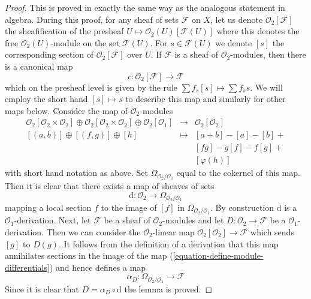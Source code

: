 \documentclass[10pt,a4paper]{amsart}
\theoremstyle{plain}
\theoremstyle{definition}
\theoremstyle{remark}
\numberwithin{equation}{subsection}
\begin{document}
\begin{proof}
This is proved in exactly the same way as the analogous statement in algebra.
During this proof, for any sheaf of sets $\mathcal{F}$ on $X$,
let us denote $\mathcal{O}_2[\mathcal{F}]$ the sheafification of the
presheaf $U \mapsto \mathcal{O}_2(U)[\mathcal{F}(U)]$ where this denotes
the free $\mathcal{O}_2(U)$-module on the set $\mathcal{F}(U)$.
For $s \in \mathcal{F}(U)$ we denote $[s]$ the corresponding section
of $\mathcal{O}_2[\mathcal{F}]$ over $U$. If $\mathcal{F}$ is a sheaf of
$\mathcal{O}_2$-modules, then there is a canonical map
$$
c : \mathcal{O}_2[\mathcal{F}] \longrightarrow \mathcal{F}
$$
which on the presheaf level is given by the rule
$\sum f_s[s] \mapsto \sum f_s s$. We will employ the short hand
$[s] \mapsto s$ to
describe this map and similarly for other maps below. Consider
the map of $\mathcal{O}_2$-modules
\begin{equation}
\label{equation-define-module-differentials}
\begin{matrix}
\mathcal{O}_2[\mathcal{O}_2 \times \mathcal{O}_2] \oplus
\mathcal{O}_2[\mathcal{O}_2 \times \mathcal{O}_2] \oplus
\mathcal{O}_2[\mathcal{O}_1] &
\longrightarrow &
\mathcal{O}_2[\mathcal{O}_2] \\
[(a, b)] \oplus [(f, g)] \oplus [h] & \longmapsto & [a + b] - [a] - [b] + \\
& & [fg] - g[f] - f[g] + \\
& & [\varphi(h)]
\end{matrix}
\end{equation}
with short hand notation as above. Set $\Omega_{\mathcal{O}_2/\mathcal{O}_1}$
equal to the cokernel of this map. Then it is clear that there exists
a map of sheaves of sets
$$
\text{d} : \mathcal{O}_2 \longrightarrow \Omega_{\mathcal{O}_2/\mathcal{O}_1}
$$
mapping a local section $f$ to the image of $[f]$ in
$\Omega_{\mathcal{O}_2/\mathcal{O}_1}$. By construction $\text{d}$
is a $\mathcal{O}_1$-derivation. Next, let $\mathcal{F}$
be a sheaf of $\mathcal{O}_2$-modules and let
$D : \mathcal{O}_2 \to \mathcal{F}$ be a $\mathcal{O}_1$-derivation.
Then we can consider the $\mathcal{O}_2$-linear map
$\mathcal{O}_2[\mathcal{O}_2] \to \mathcal{F}$ which sends $[g]$ to $D(g)$.
It follows from the definition of a derivation that this map annihilates
sections in the image of the map (\ref{equation-define-module-differentials})
and hence defines a map
$$
\alpha_D : \Omega_{\mathcal{O}_2/\mathcal{O}_1} \longrightarrow \mathcal{F}
$$
Since it is clear that $D = \alpha_D \circ \text{d}$ the lemma is proved.
\end{proof}
\end{document}
